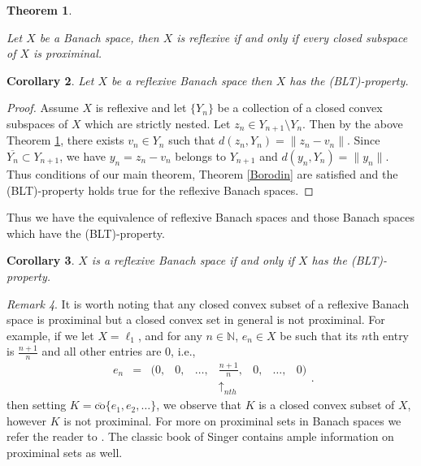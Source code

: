\documentclass[12pt, reqno]{amsart}
\newtheorem{theorem}{Theorem}[section]
\newtheorem{corollary}[theorem]{Corollary}
\theoremstyle{definition}
\theoremstyle{remark}
\newtheorem{remark}[theorem]{Remark}
\numberwithin{equation}{section}
\begin{document}
\begin{theorem}  \cite[Theorem $2.14$, p. $19$]{Singer2} \label{Sin}

Let $X$ be a Banach space, then $X$ is reflexive if and only if every closed subspace of  $X$ is proximinal.
\end{theorem}
\begin{corollary}
Let $X$ be a reflexive Banach space then $X$ has the  (BLT)-property.
\end{corollary}
\begin{proof}
Assume  $X$ is reflexive and let $\{Y_n\}$ be a collection of  a closed convex subspaces of $X$ which are strictly nested. Let $z_n \in Y_{n+1} \setminus Y_n$. Then by the above Theorem \ref{Sin},  there exists $v_n \in  Y_n$ such that $d(z_n, Y_n)= \|z_n-v_n\|$. Since $\overline{Y_n} \subset Y_{n+1}$,  we have $y_n= z_n-v_n$ belongs to $Y_{n+1}$ and $d(y_n, Y_n) = \|y_n\|$. Thus conditions of  our main theorem, Theorem \ref{Borodin}  are satisfied and the  (BLT)-property holds true for the reflexive Banach spaces.
\end{proof}
Thus we have the equivalence of reflexive Banach spaces and those Banach spaces which have the (BLT)-property.
\begin{corollary}
\label{corollary:main}
 $X$ is a reflexive Banach space if and only if  $X$ has the  (BLT)-property.
\end{corollary}

\begin{remark}
It is worth noting that any closed convex subset of a reflexive Banach space is proximinal but a closed convex set in general is not proximinal. For example, if we
let $X= \ell_1$, and for any $n \in \mathbb{N}$, $e_n \in X$ be such that its $n$th entry  is $ \frac{n+1}{n}$ and all other entries are $0$, i.e.,
\[\begin{array}{ccccccccc}
e_n & = & (0,&0,&\dots, &\frac{n+1}{n},& 0,&\dots,& 0) \\
&&&&&\uparrow_{nth} &&
\end{array}.\]
 then setting  $K = \overline{\mbox{co}}\{ e_1, e_2, \dots\}$, we observe that $K$ is a closed convex subset of $X$, however $K$ is not proximinal. For more on proximinal sets in Banach spaces we refer the reader to \cite{Ass}.  The classic book of Singer \cite{Sin} contains ample information on proximinal sets as well.
 \end{remark}

\end{document}
